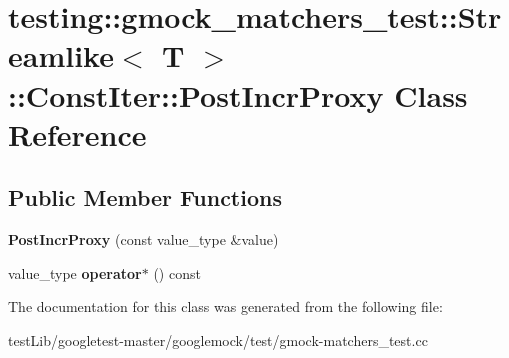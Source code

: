 \hypertarget{classtesting_1_1gmock__matchers__test_1_1Streamlike_1_1ConstIter_1_1PostIncrProxy}{}\section{testing\+:\+:gmock\+\_\+matchers\+\_\+test\+:\+:Streamlike$<$ T $>$\+:\+:Const\+Iter\+:\+:Post\+Incr\+Proxy Class Reference}
\label{classtesting_1_1gmock__matchers__test_1_1Streamlike_1_1ConstIter_1_1PostIncrProxy}
\subsection*{Public Member Functions}
\begin{DoxyCompactItemize}
\item 
\mbox{\label{classtesting_1_1gmock__matchers__test_1_1Streamlike_1_1ConstIter_1_1PostIncrProxy_a1915f8db9943b0a995c4e01d6120fc80}} 
{\bfseries Post\+Incr\+Proxy} (const value\+\_\+type \&value)
\item 
\mbox{\label{classtesting_1_1gmock__matchers__test_1_1Streamlike_1_1ConstIter_1_1PostIncrProxy_a7d5416380b6b6cec0d0ed5b5c9be17b3}} 
value\+\_\+type {\bfseries operator$\ast$} () const
\end{DoxyCompactItemize}


The documentation for this class was generated from the following file\+:\begin{DoxyCompactItemize}
\item 
test\+Lib/googletest-\/master/googlemock/test/gmock-\/matchers\+\_\+test.\+cc\end{DoxyCompactItemize}
